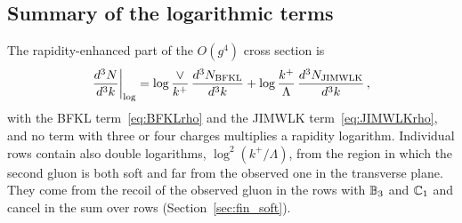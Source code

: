 \subsection{Summary of the logarithmic terms}\label{sec:logsummary}

The rapidity-enhanced part of the $O(g^4)$ cross section is
\begin{align}\label{eq:logsummary}
\frac{d^3N}{d^3k}\bigg|_{\log}=\log\frac{\vee}{k^+}\,\frac{d^3N_{\rm BFKL}}{d^3k}+\log\frac{k^+}{\Lambda}\,\frac{d^3N_{\rm JIMWLK}}{d^3k}\,,
\end{align}
with the BFKL term~\eqref{eq:BFKLrho} and the JIMWLK term~\eqref{eq:JIMWLKrho}, and no term with three or four charges multiplies a rapidity logarithm. Individual rows contain also double logarithms, $\log^2(k^+/\Lambda)$, from the region in which the second gluon is both soft and far from the observed one in the transverse plane. They come from the recoil of the observed gluon in the rows with $\mathbb{B}_3$ and $\mathbb{C}_1$ and cancel in the sum over rows (Section~\ref{sec:fin_soft}).
